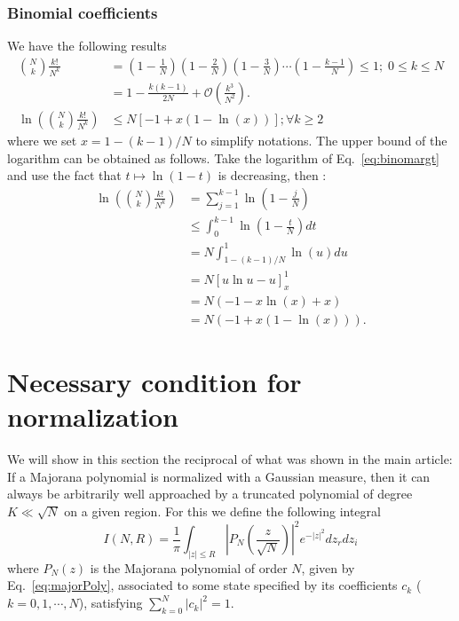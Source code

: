 \documentclass[aps,prl,showpacs,twocolumn]{revtex4-2}
\providecommand{\abs}[1]{\left\lvert#1\right\rvert}
\providecommand{\abs}[1]{\left\lvert#1\right\rvert}
\newcommand{\beq}{\begin{equation}}
\newcommand{\eeq}{\end{equation}}
\providecommand{\abs}[1]{\left\lvert#1\right\rvert}
\providecommand{\abs}[1]{\left\lvert#1\right\rvert}
\begin{document}
\subsubsection{Binomial coefficients}
We have the following results
\begin{align}
	\label{eq:binomargt}
	\binom{N}{k}\frac{k!}{N^k} &= \left(1-\frac{1}{N}\right)\left(1-\frac{2}{N}\right)\left(1-\frac{3}{N}\right)\cdots \left(1-\frac{k-1}{N}\right) \leq 1; \; 0\leq k \leq N  \\
	\label{eq:BinomApprox}
	& = 1 - \frac{k(k-1)}{2N} + \mathcal{O}(\frac{k^3}{N^2}).\\
	\label{eq:BinomJoseMaj}
	\ln \left( \binom{N}{k} \frac{k!}{N^k} \right) &\leq N [ -1 + x(1 - \ln ( x )) ]; \forall k\geq 2
\end{align}
where we set $x = 1 - (k-1)/N$ to simplify notations.
The upper bound of the logarithm can be obtained as follows.
Take the logarithm of Eq.~\eqref{eq:binomargt}
and use the fact that $t \mapsto \ln(1-t)$ is decreasing, then :
\begin{align*}
	\ln \left( \binom{N}{k} \frac{k!}{N^{k}} \right) &= \sum_{j=1}^{k-1} \ln \left( 1 - \frac{j}{N} \right)\\
	&\leq \int_{0}^{k-1} \ln \left( 1 - \frac{t}{N} \right) dt\\
	&= N \int_{1 - (k-1)/N}^1 \ln(u) du\\
	&= N [u\ln u - u]_{x}^1\\
	&= N(-1 - x\ln(x) + x)\\
	&= N(-1 + x(1 - \ln(x))).
\end{align*}


\section{Necessary condition for normalization}

We will show in this section the reciprocal of what was shown in the main article: If a Majorana polynomial is normalized with a Gaussian measure, then it can always be arbitrarily well approached by a truncated polynomial of degree $K \ll \sqrt{N}$ on a given region. For this we define the following integral
\beq
\label{eq:INR}
I(N,R) =  \frac{1}{\pi}\int_{\abs{z}\leq R}\abs{P_N\left(\frac{z}{\sqrt{N}}\right)}^2e^{-\abs{z}^2} dz_rdz_i
\eeq
where
$P_N(z)$ is the Majorana polynomial of order $N$, given by Eq.~\eqref{eq:majorPoly},    associated to some state specified by its coefficients $c_k$ ($k=0,1,\cdots, N$), satisfying $\sum_{k=0}^N\abs{c_k}^2=1$.
\end{document}
